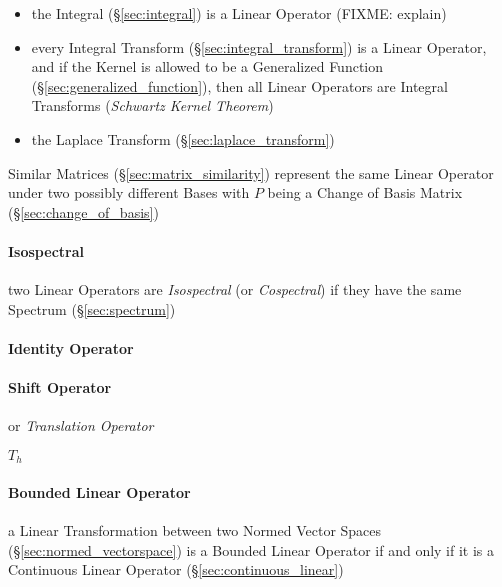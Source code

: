 \begin{itemize}
  \item the Integral (\S\ref{sec:integral}) is a Linear Operator (FIXME:
    explain)
  \item every Integral Transform (\S\ref{sec:integral_transform}) is a Linear
    Operator, and if the Kernel is allowed to be a Generalized Function
    (\S\ref{sec:generalized_function}), then all Linear Operators are Integral
    Transforms (\emph{Schwartz Kernel Theorem})
  \item the Laplace Transform (\S\ref{sec:laplace_transform})
\end{itemize}

Similar Matrices (\S\ref{sec:matrix_similarity}) represent the same Linear
Operator under two possibly different Bases with $P$ being a Change of Basis
Matrix (\S\ref{sec:change_of_basis})



\paragraph{Isospectral}\label{sec:isospectral}\hfill

two Linear Operators are \emph{Isospectral} (or \emph{Cospectral}) if they have
the same Spectrum (\S\ref{sec:spectrum})



\paragraph{Identity Operator}\label{sec:identity_operator}\hfill

\paragraph{Shift Operator}\label{sec:shift_operator}\hfill

or \emph{Translation Operator}

$T_h$



\paragraph{Bounded Linear Operator}\label{sec:bounded_linear_operator}\hfill

a Linear Transformation between two Normed Vector Spaces
(\S\ref{sec:normed_vectorspace}) is a Bounded Linear Operator if and
only if it is a Continuous Linear Operator
(\S\ref{sec:continuous_linear})

